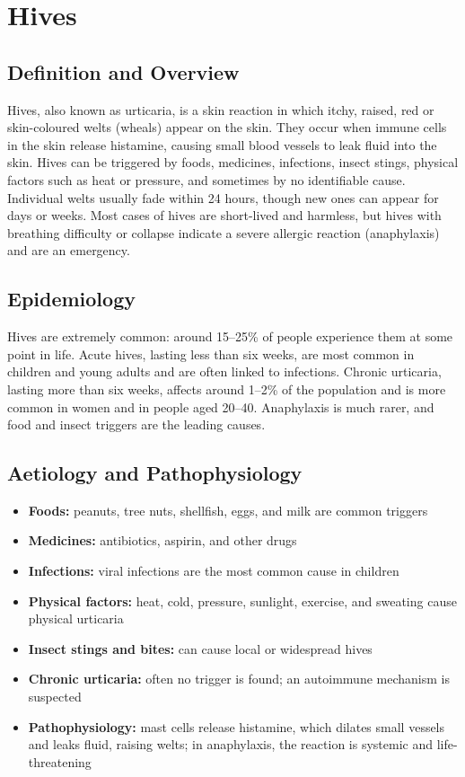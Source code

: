 \chapter{Hives}

\section*{Definition and Overview}
Hives, also known as urticaria, is a skin reaction in which itchy, raised, red or skin-coloured welts (wheals) appear on the skin. They occur when immune cells in the skin release histamine, causing small blood vessels to leak fluid into the skin. Hives can be triggered by foods, medicines, infections, insect stings, physical factors such as heat or pressure, and sometimes by no identifiable cause. Individual welts usually fade within 24 hours, though new ones can appear for days or weeks. Most cases of hives are short-lived and harmless, but hives with breathing difficulty or collapse indicate a severe allergic reaction (anaphylaxis) and are an emergency.

\section*{Epidemiology}
Hives are extremely common: around 15--25\% of people experience them at some point in life. Acute hives, lasting less than six weeks, are most common in children and young adults and are often linked to infections. Chronic urticaria, lasting more than six weeks, affects around 1--2\% of the population and is more common in women and in people aged 20--40. Anaphylaxis is much rarer, and food and insect triggers are the leading causes.

\section*{Aetiology and Pathophysiology}
\begin{itemize}
    \item \textbf{Foods:} peanuts, tree nuts, shellfish, eggs, and milk are common triggers
    \item \textbf{Medicines:} antibiotics, aspirin, and other drugs
    \item \textbf{Infections:} viral infections are the most common cause in children
    \item \textbf{Physical factors:} heat, cold, pressure, sunlight, exercise, and sweating cause physical urticaria
    \item \textbf{Insect stings and bites:} can cause local or widespread hives
    \item \textbf{Chronic urticaria:} often no trigger is found; an autoimmune mechanism is suspected
    \item \textbf{Pathophysiology:} mast cells release histamine, which dilates small vessels and leaks fluid, raising welts; in anaphylaxis, the reaction is systemic and life-threatening
\end{itemize}

